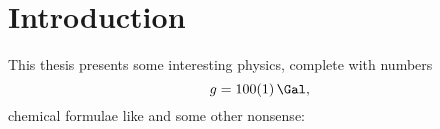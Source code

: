 \chapter{Introduction}\label{ch:introduction}
This thesis presents some interesting physics, complete with numbers
\begin{equation}
   g = \SI{100+-1}{\Gal}\text{,}
\end{equation}
chemical formulae like  and some other nonsense:

